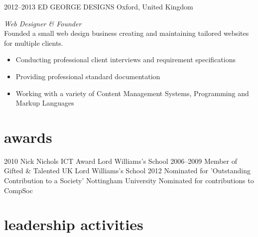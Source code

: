 \documentclass[]{friggeri-cv} %
\begin{document}
\begin{entrylist}
{\begin{itemize}
\end{itemize}}
\entry
{2012--2013}
{ED GEORGE DESIGNS}
{Oxford, United Kingdom}
{\emph{Web Designer \& Founder} \\
Founded a small web design business creating and maintaining tailored websites for multiple clients.
\begin{itemize}
\item Conducting professional client interviews and requirement specifications
\item Providing professional standard documentation
\item Working with a variety of Content Management Systems, Programming and Markup Languages
\end{itemize}}

\end{entrylist}


\section{awards}

\begin{entrylist}
\entry
{2010}
{Nick Nichols ICT Award}
{Lord Williams's School}
{}
\entry
{2006--2009}
{Member of Gifted \& Talented UK}
{Lord Williams's School}
{}
\entry
{2012}
{Nominated for 'Outstanding Contribution to a Society'}
{Nottingham University}
{Nominated for contributions to CompSoc}
\end{entrylist}


\section{leadership activities}
\end{document}
